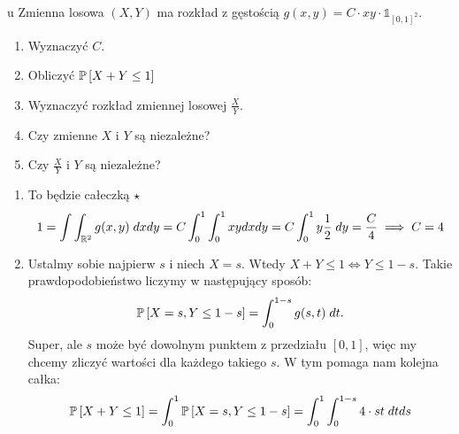\documentclass{article}
\begin{document}
\begin{problem}[2]{u}
Zmienna losowa $(X, Y)$ ma rozkład z gęstością $g(x,y)=C\cdot xy\cdot\mathds{1}_{[0,1]^2}$.
\begin{enumerate}[label=(\alph*)]
    \item Wyznaczyć $C$.
    \item Obliczyć $\prob{X+Y\leq1}$
    \item Wyznaczyć rozkład zmiennej losowej $\frac{X}{Y}$.
    \item Czy zmienne $X$ i $Y$ są niezależne?
    \item Czy $\frac{X}{Y}$ i $Y$ są niezależne?
\end{enumerate}
\end{problem}

\begin{enumerate}[label=(\alph*), leftmargin=*]
    \item To będzie całeczką $\star$
    \begin{align*}
        1=\int\int_{\mathbb{R}^2}g(x,y)\;dxdy=C\int_0^1\int_0^1xydxdy=C\int_0^1y\frac{1}{2}\;dy=\frac{C}{4}\implies C=4
    \end{align*}
%
    \item Ustalmy sobie najpierw $s$ i niech $X=s$. Wtedy $X+Y\leq 1\iff Y\leq1-s$. Takie prawdopodobieństwo liczymy w następujący sposób:
    $$\prob{X=s, Y\leq 1-s}=\int_0^{1-s}g(s,t)\;dt.$$
    Super, ale $s$ może być dowolnym punktem z przedziału $[0, 1]$, więc my chcemy zliczyć wartości dla każdego takiego $s$. W tym pomaga nam kolejna całka:
    $$\prob{X+Y\leq 1}=\int_0^1\prob{X=s, Y\leq 1-s}=\int_0^1\int_0^{1-s}4\cdot st \;{dtds}$$

\end{enumerate}
\end{document}
